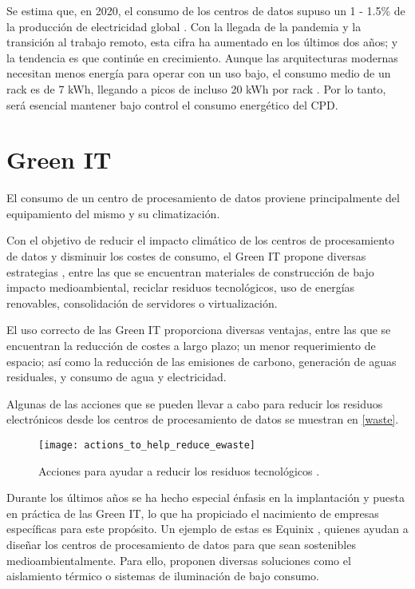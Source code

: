 Se estima que, en 2020, el consumo de los centros de datos supuso un 1 - 1.5\% de la producción de electricidad global \cite{mytton-dc}. Con la llegada de la pandemia y la transición al trabajo remoto, esta cifra ha aumentado en los últimos dos años; y la tendencia es que continúe en crecimiento. Aunque las arquitecturas modernas necesitan menos energía para operar con un uso bajo, el consumo medio de un rack es de 7 kWh, llegando a picos de incluso 20 kWh por rack \cite{datacenters-density}. Por lo tanto, será esencial mantener bajo control el consumo energético del CPD.

\section{Green IT}

El consumo de un centro de procesamiento de datos proviene principalmente del equipamiento del mismo y su climatización.

Con el objetivo de reducir el impacto climático de los centros de procesamiento de datos y disminuir los costes de consumo, el Green IT propone diversas estrategias \cite{techtargetgreen}, entre las que se encuentran materiales de construcción de bajo impacto medioambiental, reciclar residuos tecnológicos, uso de energías renovables, consolidación de servidores o virtualización.

El uso correcto de las Green IT proporciona diversas ventajas, entre las que se encuentran la reducción de costes a largo plazo; un menor requerimiento de espacio; así como la reducción de las emisiones de carbono, generación de aguas residuales, y consumo de agua y electricidad.

Algunas de las acciones que se pueden llevar a cabo para reducir los residuos electrónicos desde los centros de procesamiento de datos se muestran en \eqref{waste}.

\begin{figure}
    \begin{center}
        \texttt{[image: actions\_to\_help\_reduce\_ewaste]}
        \caption{Acciones para ayudar a reducir los residuos tecnológicos \cite{techtargetgreen}.}
        \label{waste}
    \end{center}
\end{figure}

Durante los últimos años se ha hecho especial énfasis en la implantación y puesta en práctica de las Green IT, lo que ha propiciado el nacimiento de empresas específicas para este propósito. Un ejemplo de estas es Equinix \cite{equinix}, quienes ayudan a diseñar los centros de procesamiento de datos para que sean sostenibles medioambientalmente. Para ello, proponen diversas soluciones como el aislamiento térmico o sistemas de iluminación de bajo consumo.

